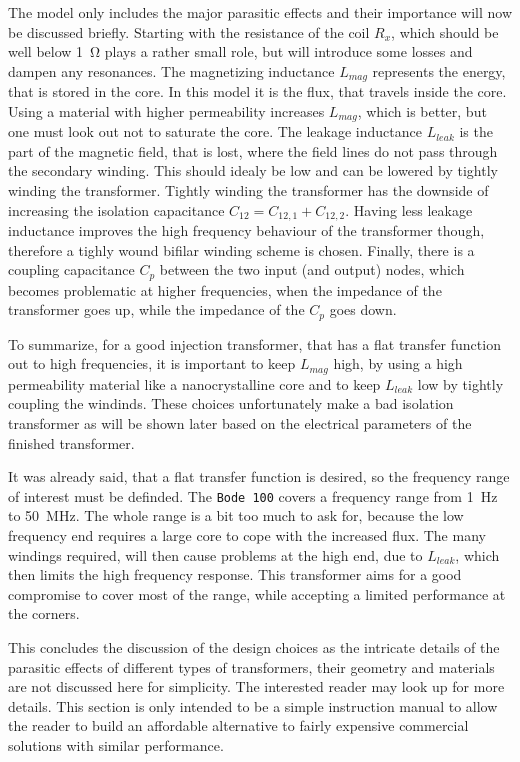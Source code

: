 \documentclass[12pt]{book}
\providecommand{\device}[1]{\texttt{\small #1}}
\begin{document}
The model only includes the major parasitic effects and their importance will now be discussed briefly. Starting with the resistance of the coil $R_x$, which should be well below \qty{1}{\ohm} plays a rather small role, but will introduce some losses and dampen any resonances. The magnetizing inductance $L_{mag}$ represents the energy, that is stored in the core. In this model it is the flux, that travels inside the core. Using a material with higher permeability increases $L_{mag}$, which is better, but one must look out not to saturate the core. The leakage inductance $L_{leak}$ is the part of the magnetic field, that is lost, where the field lines do not pass through the secondary winding. This should idealy be low and can be lowered by tightly winding the transformer. Tightly winding the transformer has the downside of increasing the isolation capacitance $C_{12} = C_{12,1} + C_{12,2}$. Having less leakage inductance improves the high frequency behaviour of the transformer though, therefore a tighly wound bifilar winding scheme is chosen. Finally, there is a coupling capacitance $C_p$ between the two input (and output) nodes, which becomes problematic at higher frequencies, when the impedance of the transformer goes up, while the impedance of the $C_p$ goes down.

To summarize, for a good injection transformer, that has a flat transfer function out to high frequencies, it is important to keep $L_{mag}$ high, by using a high permeability material like a nanocrystalline core and to keep $L_{leak}$ low by tightly coupling the windinds. These choices unfortunately make a bad isolation transformer as will be shown later based on the electrical parameters of the finished transformer.

It was already said, that a flat transfer function is desired, so the frequency range of interest must be definded. The \device{Bode 100} covers a frequency range from \qty{1}{\Hz} to \qty{50}{\MHz}. The whole range is a bit too much to ask for, because the low frequency end requires a large core to cope with the increased flux. The many windings required, will then cause problems at the high end, due to $L_{leak}$, which then limits the high frequency response. This transformer aims for a good compromise to cover most of the range, while accepting a limited performance at the corners.

This concludes the discussion of the design choices as the intricate details of the parasitic effects of different types of transformers, their geometry and materials are not discussed here for simplicity. The interested reader may look up \cite{transformer_windings} for more details. This section is only intended to be a simple instruction manual to allow the reader to build an affordable alternative to fairly expensive commercial solutions with similar performance.
\end{document}
